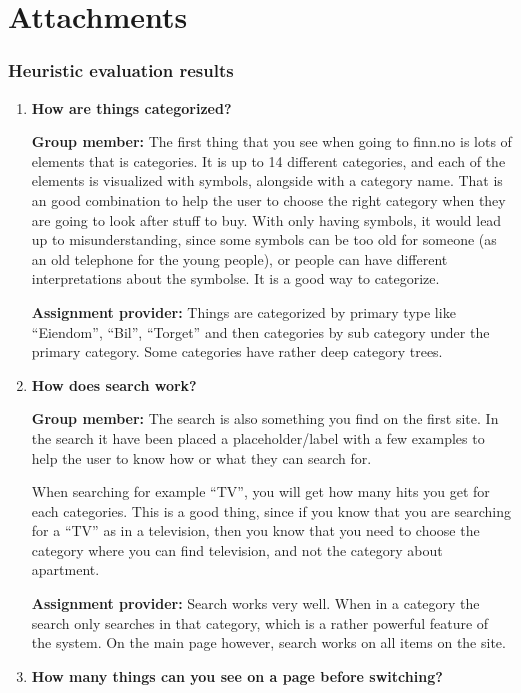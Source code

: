 \chapter{Attachments}

\subsection{Heuristic evaluation results}

\begin{enumerate}
    \item \textbf{How are things categorized?}
    
\textbf{Group member:} 
The first thing that you see when going to finn.no is lots of elements that is categories. It is up to 14 different categories, and each of the elements is visualized with symbols, alongside with a category name. That is an good combination to help the user to choose the right category when they are going to look after stuff to buy. With only having symbols, it would lead up to misunderstanding, since some symbols can be too old for someone (as an old telephone for the young people), or people can have different interpretations about the symbolse. It is a good way to categorize. 

\textbf{Assignment provider:}
Things are categorized by primary type like “Eiendom”, “Bil”, “Torget” and then categories by sub category under the primary category. Some categories have rather deep category trees.

    \item \textbf{How does search work?}

\textbf{Group member:} 
The search is also something you find on the first site. In the search it have been placed a placeholder/label with a few examples to help the user to know how or what they can search for. 

When searching for example “TV”, you will get how many hits you get for each categories. This is a good thing, since if you know that you are searching for a “TV” as in a television, then you know that you need to choose the category where you can find television, and not the category about apartment. 

\textbf{Assignment provider:}
Search works very well. When in a category the search only searches in that category, which is a rather powerful feature of the system. On the main page however, search works on all items on the site.

    \item \textbf{How many things can you see on a page before switching?}


\end{enumerate}
